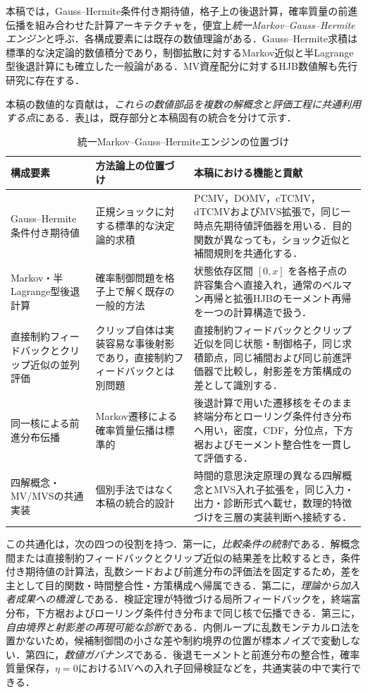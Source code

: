 \documentclass[10pt,a4paper]{article}
\theoremstyle{plain}
\theoremstyle{definition}
\begin{document}
本稿では，Gauss--Hermite条件付き期待値，格子上の後退計算，確率質量の前進伝播を組み合わせた計算アーキテクチャを，便宜上\emph{統一Markov--Gauss--Hermiteエンジン}と呼ぶ．各構成要素には既存の数値理論がある．Gauss--Hermite求積は標準的な決定論的数値積分であり\citep{AbramowitzStegun1972,Judd1998}，制御拡散に対するMarkov近似と半Lagrange型後退計算にも確立した一般論がある\citep{KushnerDupuis2001,FalconeFerretti2014}．MV資産配分に対するHJB数値解も先行研究に存在する\citep{WangForsyth2012,WangForsyth2012Comparison}．

本稿の数値的な貢献は，\emph{これらの数値部品を複数の解概念と評価工程に共通利用する点}にある．表\ref{tab:gh-engine-positioning}は，既存部分と本稿固有の統合を分けて示す．

\begin{table}[htbp]
\centering\small
\caption{統一Markov--Gauss--Hermiteエンジンの位置づけ}
\label{tab:gh-engine-positioning}
\begin{tabularx}{\textwidth}{p{34mm}p{43mm}X}
\toprule
構成要素 & 方法論上の位置づけ & 本稿における機能と貢献 \\
\midrule
Gauss--Hermite条件付き期待値
& 正規ショックに対する標準的な決定論的求積
& PCMV，DOMV，cTCMV，dTCMVおよびMVS拡張で，同じ一時点先期待値評価器を用いる．目的関数が異なっても，ショック近似と補間規則を共通化する．\\
Markov・半Lagrange型後退計算
& 確率制御問題を格子上で解く既存の一般的方法
& 状態依存区間 $[0,x]$ を各格子点の許容集合へ直接入れ，通常のベルマン再帰と拡張HJBのモーメント再帰を一つの計算構造で扱う．\\
直接制約フィードバックとクリップ近似の並列評価
& クリップ自体は実装容易な事後射影であり，直接制約フィードバックとは別問題
& 直接制約フィードバックとクリップ近似を同じ状態・制御格子，同じ求積節点，同じ補間および同じ前進評価器で比較し，射影差を方策構成の差として識別する．\\
同一核による前進分布伝播
& Markov遷移による確率質量伝播は標準的
& 後退計算で用いた遷移核をそのまま終端分布とローリング条件付き分布へ用い，密度，CDF，分位点，下方裾およびモーメント整合性を一貫して評価する．\\
四解概念・MV/MVSの共通実装
& 個別手法ではなく本稿の統合的設計
& 時間的意思決定原理の異なる四解概念とMVS入れ子拡張を，同じ入力・出力・診断形式へ載せ，数理的特徴づけを三層の実装判断へ接続する．\\
\bottomrule
\end{tabularx}
\end{table}

この共通化は，次の四つの役割を持つ．第一に，\emph{比較条件の統制}である．解概念間または直接制約フィードバックとクリップ近似の結果差を比較するとき，条件付き期待値の計算法，乱数シードおよび前進分布の評価法を固定するため，差を主として目的関数・時間整合性・方策構成へ帰属できる．第二に，\emph{理論から加入者成果への橋渡し}である．検証定理が特徴づける局所フィードバックを，終端富分布，下方裾およびローリング条件付き分布まで同じ核で伝播できる．第三に，\emph{自由境界と射影差の再現可能な診断}である．内側ループに乱数モンテカルロ法を置かないため，候補制御間の小さな差や制約境界の位置が標本ノイズで変動しない．第四に，\emph{数値ガバナンス}である．後退モーメントと前進分布の整合性，確率質量保存，$\eta=0$におけるMVへの入れ子回帰検証などを，共通実装の中で実行できる．
\end{document}
